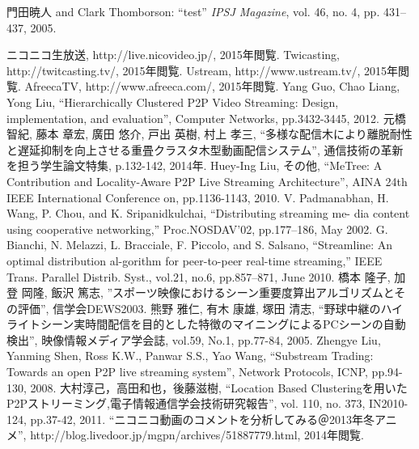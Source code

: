%
%
\begin{thebibliography}{99}

門田暁人 and Clark Thomborson:
``test''
{\it IPSJ Magazine}, vol. 46, no. 4, pp. 431--437, 2005.

  ニコニコ生放送, http://live.nicovideo.jp/, 2015年閲覧.
  Twicasting, http://twitcasting.tv/, 2015年閲覧.
  Ustream, http://www.ustream.tv/, 2015年閲覧.
  AfreecaTV, http://www.afreeca.com/, 2015年閲覧.
  Yang Guo, Chao Liang, Yong Liu, “Hierarchically Clustered P2P Video Streaming: Design, implementation, and evaluation”, Computer Networks, pp.3432-3445, 2012.
  元橋 智紀, 藤本 章宏, 廣田 悠介, 戸出 英樹, 村上 孝三, “多様な配信木により離脱耐性と遅延抑制を向上させる重畳クラスタ木型動画配信システム”, 通信技術の革新を担う学生論文特集, p.132-142, 2014年.
  Huey-Ing Liu, その他, “MeTree: A Contribution and Locality-Aware P2P Live Streaming Architecture”, AINA 24th IEEE International Conference on, pp.1136-1143, 2010.
  V. Padmanabhan, H. Wang, P. Chou, and K. Sripanidkulchai, “Distributing streaming me-
dia content using cooperative networking,” Proc.NOSDAV’02, pp.177–186, May 2002.
  G. Bianchi, N. Melazzi, L. Bracciale, F. Piccolo, and S. Salsano, “Streamline: An optimal distribution al-gorithm for peer-to-peer real-time streaming,” IEEE Trans. Parallel Distrib. Syst., vol.21, no.6, pp.857–871, June 2010.
  橋本 隆子, 加登 岡隆, 飯沢 篤志, ”スポーツ映像におけるシーン重要度算出アルゴリズムとその評価”, 信学会DEWS2003.
  熊野 雅仁, 有木 康雄, 塚田 清志, “野球中継のハイライトシーン実時間配信を目的とした特徴のマイニングによるPCシーンの自動検出”, 映像情報メディア学会誌, vol.59, No.1, pp.77-84, 2005.
  Zhengye Liu, Yanming Shen, Ross K.W., Panwar S.S., Yao Wang, “Substream Trading: Towards an open P2P live streaming system”, Network Protocols, ICNP, pp.94-130, 2008.
  大村淳己，高田和也，後藤滋樹, “Location Based Clusteringを用いたP2Pストリーミング,電子情報通信学会技術研究報告”, vol. 110, no. 373, IN2010-124, pp.37-42, 2011.
  “ニコニコ動画のコメントを分析してみる＠2013年冬アニメ”, http://blog.livedoor.jp/mgpn/archives/51887779.html, 2014年閲覧.


\end{thebibliography}
